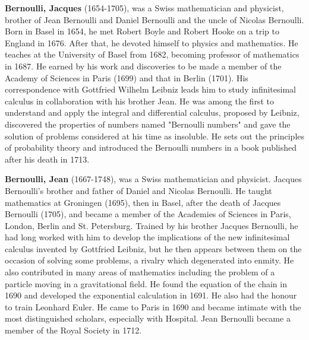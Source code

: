 \textbf{Bernoulli, Jacques} (1654-1705), was a Swiss mathematician and physicist, brother of Jean Bernoulli and Daniel Bernoulli and the uncle of Nicolas Bernoulli. Born in Basel in 1654, he met Robert Boyle and Robert Hooke on a trip to England in 1676. After that, he devoted himself to physics and mathematics. He teaches at the University of Basel from 1682, becoming professor of mathematics in 1687. He earned by his work and discoveries to be made a member of the Academy of Sciences in Paris (1699) and that in Berlin (1701). His correspondence with Gottfried Wilhelm Leibniz leads him to study infinitesimal calculus in collaboration with his brother Jean. He was among the first to understand and apply the integral and differential calculus, proposed by Leibniz, discovered the properties of numbers named "Bernoulli numbers" and gave the solution of problems considered at his time as insoluble. He sets out the principles of probability theory and introduced the Bernoulli numbers in a book published after his death in 1713.

\textbf{Bernoulli, Jean} (1667-1748), was a Swiss mathematician and physicist. Jacques Bernoulli's brother and father of Daniel and Nicolas Bernoulli. He taught mathematics at Groningen (1695), then in Basel, after the death of Jacques Bernoulli (1705), and became a member of the Academies of Sciences in Paris, London, Berlin and St. Petersburg. Trained by his brother Jacques Bernoulli, he had long worked with him to develop the implications of the new infinitesimal calculus invented by Gottfried Leibniz, but he then appears between them on the occasion of solving some problems, a rivalry which degenerated into enmity. He also contributed in many areas of mathematics including the problem of a particle moving in a gravitational field. He found the equation of the chain in 1690 and developed the exponential calculation in 1691. He also had the honour to train Leonhard Euler. He came to Paris in 1690 and became intimate with the most distinguished scholars, especially with Hospital. Jean Bernoulli became a member of the Royal Society in 1712.

